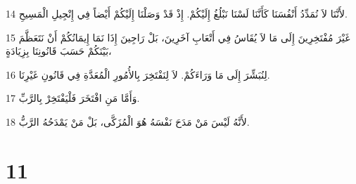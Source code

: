 \par 14 لأَنَّنَا لاَ نُمَدِّدُ أَنْفُسَنَا كَأَنَّنَا لَسْنَا نَبْلُغُ إِلَيْكُمْ. إِذْ قَدْ وَصَلْنَا إِلَيْكُمْ أَيْضاً فِي إِنْجِيلِ الْمَسِيحِ.
\par 15 غَيْرَ مُفْتَخِرِينَ إِلَى مَا لاَ يُقَاسُ فِي أَتْعَابِ آخَرِينَ، بَلْ رَاجِينَ إِذَا نَمَا إِيمَانُكُمْ أَنْ نَتَعَظَّمَ بَيْنَكُمْ حَسَبَ قَانُونِنَا بِزِيَادَةٍ،
\par 16 لِنُبَشِّرَ إِلَى مَا وَرَاءَكُمْ. لاَ لِنَفْتَخِرَ بِالأُمُورِ الْمُعَدَّةِ فِي قَانُونِ غَيْرِنَا.
\par 17 وَأَمَّا مَنِ افْتَخَرَ فَلْيَفْتَخِرْ بِالرَّبِّ.
\par 18 لأَنَّهُ لَيْسَ مَنْ مَدَحَ نَفْسَهُ هُوَ الْمُزَكَّى، بَلْ مَنْ يَمْدَحُهُ الرَّبُّ.

\chapter{11}

